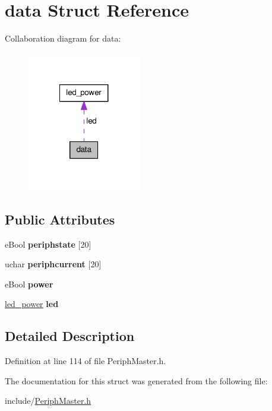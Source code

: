 \hypertarget{structdata}{\section{data \-Struct \-Reference}
\label{structdata}
}


\-Collaboration diagram for data\-:
\nopagebreak
\begin{figure}[H]
\begin{center}
\leavevmode
\includegraphics[width=140pt]{structdata__coll__graph}
\end{center}
\end{figure}
\subsection*{\-Public \-Attributes}
\begin{DoxyCompactItemize}
\item 
\hypertarget{structdata_a1d81dbe5ac2a692b6c8a133f22572f3b}{e\-Bool {\bfseries periphstate} \mbox{[}20\mbox{]}}\label{structdata_a1d81dbe5ac2a692b6c8a133f22572f3b}

\item 
\hypertarget{structdata_af80d98212f77695b58afe4809076cc61}{uchar {\bfseries periphcurrent} \mbox{[}20\mbox{]}}\label{structdata_af80d98212f77695b58afe4809076cc61}

\item 
\hypertarget{structdata_a8ad4339b12c77666c3ef477a3446a116}{e\-Bool {\bfseries power}}\label{structdata_a8ad4339b12c77666c3ef477a3446a116}

\item 
\hypertarget{structdata_a3fab12d9fa5a00e9ed451af99125e409}{\hyperlink{structled__power}{led\-\_\-power} {\bfseries led}}\label{structdata_a3fab12d9fa5a00e9ed451af99125e409}

\end{DoxyCompactItemize}


\subsection{\-Detailed \-Description}


\-Definition at line 114 of file \-Periph\-Master.\-h.



\-The documentation for this struct was generated from the following file\-:\begin{DoxyCompactItemize}
\item 
include/\hyperlink{_periph_master_8h}{\-Periph\-Master.\-h}\end{DoxyCompactItemize}
